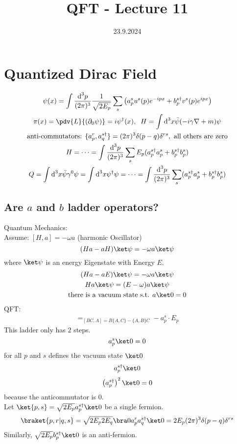 \documentclass[]{scrartcl}
\title{QFT - Lecture 11}
\author{}
\date{23.9.2024}
\begin{document}
\maketitle
\newpage
\tableofcontents
\newpage

\section{Quantized Dirac Field}
\begin{gather}
\psi(x) = \int \frac{\text d^3p}{(2\pi)^3}\frac{1}{\sqrt{2E_p}}\sum_s\left(a_p^s u^s(p) e^{-ipx} + b_p^{s\dagger} v^s(p) e^{ipx}\right)\\
\pi(x) = \pdv{L}{(\partial_0\psi)}  = i\psi^\dagger(x),\;\; H=\int\text d^3x \bar\psi(-i\gamma\nabla + m)\psi\\
\text{anti-commutators: } \{a_p^r, a_q^{s\dagger}\} = (2\pi)^3\delta(p-q)\delta^{rs}, \text{ all others are zero}\\
H = \cdots = \int\frac{\text d^3p}{(2\pi)^3} \sum_s E_p(a^{s\dagger}_p a^s_p + b^{s\dagger}_p b^s_p)\\
Q = \int\text d^3x \bar\psi\gamma^0\psi = \int\text d^3x \psi^\dagger\psi = \cdots = \int \frac{\text d^3p}{(2\pi)^3}\sum_s (a_p^{s\dagger}a_p^s + b_p^{s\dagger}b_p^s)
\end{gather}

\subsection{Are $a$ and $b$ ladder operators?}
Quantum Mechanics:\\
Assume: $[H,a] = -\omega a$ (harmonic Oscillator)
$$
(Ha - aH)\ket\psi = -\omega a\ket\psi
$$
where $\ket\psi$ is an energy Eigenstate with Energy $E$.
\begin{gather}
	(Ha - aE)\ket\psi = -\omega a\ket\psi\\
	Ha\ket\psi = (E - \omega)a\ket\psi\\
	\text{there is a vacuum state s.t. } a\ket 0 = 0
\end{gather}
QFT:\\
\begin{gather}
	[H, a_p^s] =_{[BC, A] = B\{A,C\} - \{A,B\}C} -a_p^s \cdot E_p
\end{gather}
This ladder only has $2$ steps.
$$
a_p^s\ket0=0
$$
for all $p$ and $s$ defines the vacuum state $\ket0$
$$
a_p^{s\dagger}\ket0
$$
$$
\left(a_p^{s\dagger}\right)^2\ket0 = 0
$$
because the anticommutator is $0$.\\
Let $\ket{p,s} = \sqrt{2E_p}a_p^{s\dagger}\ket0$ be a single fermion.
$$
\braket{p,r | q,s} = \sqrt{2E_p 2E_q}\bra0 a_p^r a_q^{s\dagger}\ket0 = 2E_p (2\pi)^3\delta(p-q)\delta^{rs}
$$
Similarly, $\sqrt{2E_p}b_p^{s\dagger}\ket 0$ is an anti-fermion.
\end{document}
